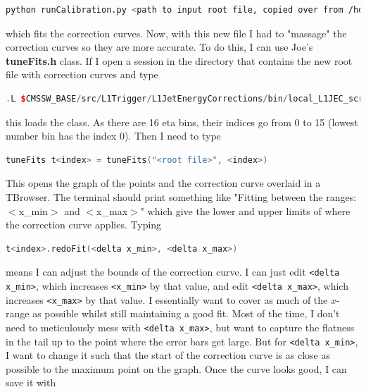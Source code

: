 \begin{lstlisting}[belowskip=-0.7cm, language=sh, numbers=none]
python runCalibration.py <path to input root file, copied over from /hdfs> <path and name of new root file> --redo-correction-fit --inherit-params --stage2
\end{lstlisting}

which fits the correction curves. Now, with this new file I had to "massage" the correction curves so they are more accurate. To do this, I can use Joe's \textbf{tuneFits.h} \ROOT class. If I open a \ROOT session in the directory that contains the new root file with correction curves and type

\begin{lstlisting}[belowskip=-0.7cm, language=C++, numbers=none]
.L $CMSSW_BASE/src/L1Trigger/L1JetEnergyCorrections/bin/local_L1JEC_scripts/tuneFits.h+
\end{lstlisting}

this loads the class. As there are 16 eta bins, their indices go from 0 to 15 (lowest number bin has the index 0). Then I need to type

\begin{lstlisting}[belowskip=-0.7cm, language=C++, numbers=none]
tuneFits t<index> = tuneFits("<root file>", <index>)
\end{lstlisting}

This opens the graph of the points and the correction curve overlaid in a TBrowser. The terminal should print something like "Fitting between the ranges: $<$x\_min$>$ and $<$x\_max$>$" which give the lower and upper limits of where the correction curve applies. Typing

\begin{lstlisting}[belowskip=-0.7cm, language=C++, numbers=none]
t<index>.redoFit(<delta x_min>, <delta x_max>)
\end{lstlisting}

means I can adjust the bounds of the correction curve. I can just edit \texttt{<delta x\_min>}, which increases \texttt{<x\_min>} by that value, and edit \texttt{<delta x\_max>}, which increases \texttt{<x\_max>} by that value. I essentially want to cover as much of the $x$-range as possible whilst still maintaining a good fit. Most of the time, I don't need to meticulously mess with \texttt{<delta x\_max>}, but want to capture the flatness in the tail up to the point where the error bars get large. But for \texttt{<delta x\_min>}, I want to change it such that the start of the correction curve is as close as possible to the maximum point on the graph. Once the curve looks good, I can save it with

